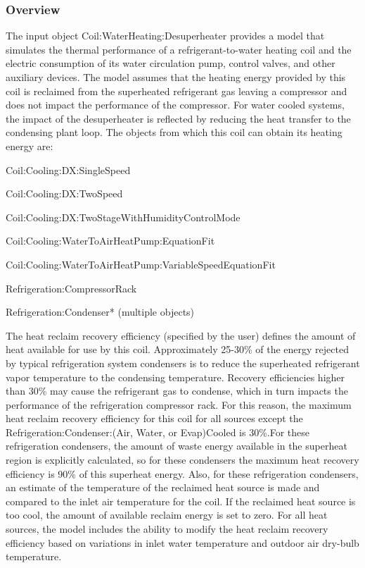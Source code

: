 \subsubsection{Overview}\label{overview-10}

The input object Coil:WaterHeating:Desuperheater provides a model that simulates the thermal performance of a refrigerant-to-water heating coil and the electric consumption of its water circulation pump, control valves, and other auxiliary devices. The model assumes that the heating energy provided by this coil is reclaimed from the superheated refrigerant gas leaving a compressor and does not impact the performance of the compressor. For water cooled systems, the impact of the desuperheater is reflected by reducing the heat transfer to the condensing plant loop. The objects from which this coil can obtain its heating energy are:

Coil:Cooling:DX:SingleSpeed

Coil:Cooling:DX:TwoSpeed

Coil:Cooling:DX:TwoStageWithHumidityControlMode

Coil:Cooling:WaterToAirHeatPump:EquationFit

Coil:Cooling:WaterToAirHeatPump:VariableSpeedEquationFit

Refrigeration:CompressorRack

Refrigeration:Condenser* (multiple objects)

The heat reclaim recovery efficiency (specified by the user) defines the amount of heat available for use by this coil. Approximately 25-30\% of the energy rejected by typical refrigeration system condensers is to reduce the superheated refrigerant vapor temperature to the condensing temperature. Recovery efficiencies higher than 30\% may cause the refrigerant gas to condense, which in turn impacts the performance of the refrigeration compressor rack. For this reason, the maximum heat reclaim recovery efficiency for this coil for all sources except the Refrigeration:Condenser:(Air, Water, or Evap)Cooled is 30\%.For these refrigeration condensers, the amount of waste energy available in the superheat region is explicitly calculated, so for these condensers the maximum heat recovery efficiency is 90\% of this superheat energy. Also, for these refrigeration condensers, an estimate of the temperature of the reclaimed heat source is made and compared to the inlet air temperature for the coil. If the reclaimed heat source is too cool, the amount of available reclaim energy is set to zero. For all heat sources, the model includes the ability to modify the heat reclaim recovery efficiency based on variations in inlet water temperature and outdoor air dry-bulb temperature.

